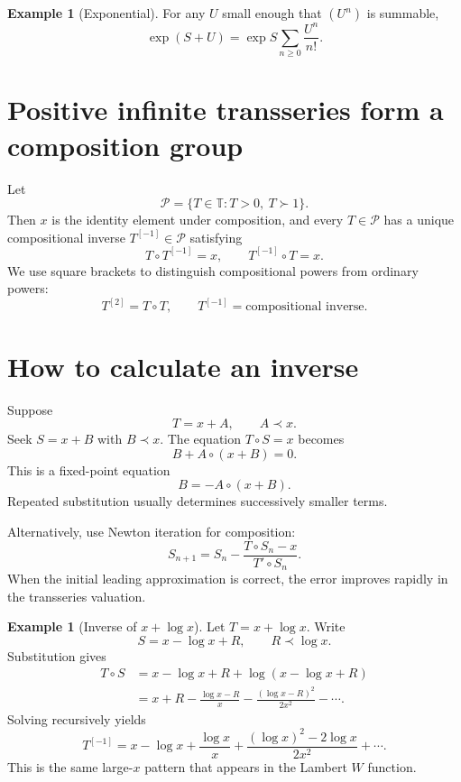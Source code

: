 \documentclass[11pt,oneside]{book}
\theoremstyle{definition}
\newtheorem{example}[theorem]{Example}
\theoremstyle{remark}
\newcommand{\T}{\mathbb{T}}
\newcommand{\precdom}{\prec}
\newcommand{\succdom}{\succ}
\newcommand{\compose}{\mathbin{\circ}}
\begin{document}
\begin{example}[Exponential]
For any $U$ small enough that $(U^n)$ is summable,
\[
  \exp(S+U)=\exp S\sum_{n\ge0}\frac{U^n}{n!}.
\]
\end{example}

\section{Positive infinite transseries form a composition group}

Let
\[
  \mathcal P=\{T\in\T:T>0,\ T\succdom1\}.
\]
Then $x$ is the identity element under composition, and every $T\in\mathcal P$
has a unique compositional inverse $T^{[-1]}\in\mathcal P$ satisfying
\[
  T\compose T^{[-1]}=x,
  \qquad
  T^{[-1]}\compose T=x.
\]
We use square brackets to distinguish compositional powers from ordinary powers:
\[
  T^{[2]}=T\compose T,
  \qquad T^{[-1]}=\text{compositional inverse}.
\]

\section{How to calculate an inverse}

Suppose
\[
  T=x+A,
  \qquad A\precdom x.
\]
Seek $S=x+B$ with $B\precdom x$. The equation $T\compose S=x$ becomes
\begin{equation}
  B+A\compose(x+B)=0.
  \label{eq:inverse-fixed-point}
\end{equation}
This is a fixed-point equation
\[
  B=-A\compose(x+B).
\]
Repeated substitution usually determines successively smaller terms.

Alternatively, use Newton iteration for composition:
\begin{equation}
  S_{n+1}=S_n-\frac{T\compose S_n-x}{T'\compose S_n}.
  \label{eq:composition-newton}
\end{equation}
When the initial leading approximation is correct, the error improves rapidly in
the transseries valuation.

\begin{example}[Inverse of $x+\log x$]
Let $T=x+\log x$. Write
\[
  S=x-\log x+R,
  \qquad R\precdom\log x.
\]
Substitution gives
\begin{align*}
 T\compose S
 &=x-\log x+R+\log(x-\log x+R)\\
 &=x+R-\frac{\log x-R}{x}
   -\frac{(\log x-R)^2}{2x^2}-\cdots.
\end{align*}
Solving recursively yields
\[
  T^{[-1]}
  =x-\log x+\frac{\log x}{x}
   +\frac{(\log x)^2-2\log x}{2x^2}+\cdots.
\]
This is the same large-$x$ pattern that appears in the Lambert $W$ function.
\end{example}
\end{document}
